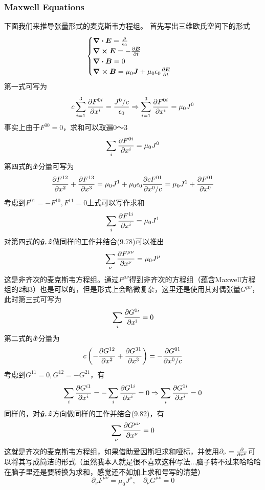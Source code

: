 \documentclass[14pt,oneside]{book}
\def \i{\mathrm{i}}
\def \x{\vb*{\hat x}}
\def \y{\vb*{\hat y}}
\def \z{\vb*{\hat z}}
\begin{document}
\begin{large}
\subsubsection{Maxwell Equations}
下面我们来推导张量形式的麦克斯韦方程组。
首先写出三维欧氏空间下的形式
\begin{align}
        \begin{cases}
                \div{\vb*{E}}=\frac{\rho}{\epsilon_0}\\
                \curl{\vb*{E}}=-\pdv{\vb*{B}}{t} \\
                \div{\vb*{B}}=0\\
                \curl{\vb*{B}}=\mu_0\vb*{J}+\mu_0\epsilon_0\pdv{\vb*{E}}{t}& 
        \end{cases}
\end{align}
第一式可写为
\begin{equation}
 c \sum_{i=1}^3\pdv{F^{0i}}{x^i}=\frac{J^0/c}{\epsilon_0}\Rightarrow \sum_{i=1}^3\pdv{F^{0i}}{x^i}=\mu_0J^0
\end{equation}
事实上由于$F^{00}=0$，求和可以取遍0～3
\begin{equation}
  \sum_i\pdv{F^{0i}}{x^i}=\mu_0 J^0
\end{equation}
第四式的$\x$分量可写为
\begin{equation}
  \pdv{F^{12}}{x^{2}}+\pdv{F^{13}}{x^3}=\mu_0J^1+\mu_0\epsilon_0\pdv{cF^{01}}{x^0/c}=\mu_0J^1+\pdv{F^{01}}{x^0 }
 \end{equation}
 考虑到$F^{01}=-F^{10},F^{11}=0$上式可以写作求和
 \begin{equation}
  \sum_i\pdv{F^{1 i }}{x^i}=\mu_0 J^1
\end{equation}
对第四式的$\y,\z$做同样的工作并结合(9.78)可以推出
\begin{equation}
  \sum_\nu \pdv{F^{\mu \nu}}{x^\nu}=\mu_0 J^\mu
\end{equation}
这是非齐次的麦克斯韦方程组。通过$F^{\mu\nu}$得到非齐次的方程组（蕴含Maxwell方程组的2和3）也是可以的，但是形式上会略微复杂，这里还是使用其对偶张量$G^{\mu\nu}$，此时第三式可写为
\begin{equation}
  \sum_i \pdv{G^{0i}}{x^\i}=0
\end{equation}
第二式的$\x$分量为
\begin{equation}
  c\left(-\pdv{G^{12}}{x^2}+\pdv{G^{31}}{x^3}\right)=-\pdv{G^{01}}{x^0/c}
\end{equation}
考虑到$G^{11}=0,G^{12}=-G^{21}$，有
\begin{equation}
  \sum_i\pdv{G^{i1}}{x^i}=-\sum_i\pdv{G^{1i}}{x^i}=0\Rightarrow\sum_i\pdv{G^{1i}}{x^i}=0
\end{equation}
同样的，对$\y,\z$方向做同样的工作并结合(9.82)，有
\begin{equation}
 \sum_\nu \pdv{G^{\mu\nu}}{x^\nu}=0
\end{equation}
这就是齐次的麦克斯韦方程组，如果借助爱因斯坦求和哑标，并使用$\partial_\nu=\pdv{}{x^\nu}$可以将其写成简洁的形式（虽然我本人就是很不喜欢这种写法...脑子转不过来哈哈哈 在脑子里还是要转换为求和，感觉还不如加上求和号写的清楚）
\begin{equation}
  \partial_\nu F^{\mu\nu}=\mu_0 J^\mu,\quad \partial_\nu G^{\mu\nu}=0
\end{equation}


\end{large}
\end{document}
